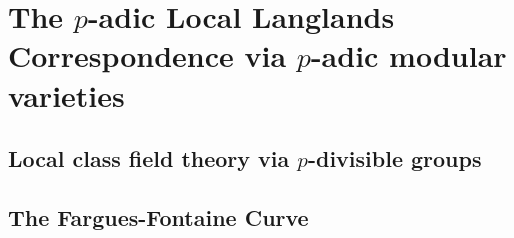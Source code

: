    \part{The \texorpdfstring{$p$}{}-adic Local Langlands Correspondence via \texorpdfstring{$p$}{}-adic modular varieties}
        \chapter{Local class field theory via \texorpdfstring{$p$}{}-divisible groups}
            \begin{abstract}
                
            \end{abstract}
            
            
            
            
    
        \chapter{The Fargues-Fontaine Curve}
            \begin{abstract}
                
            \end{abstract}
            
            \minitoc
            
            
            
            
            
            
        
